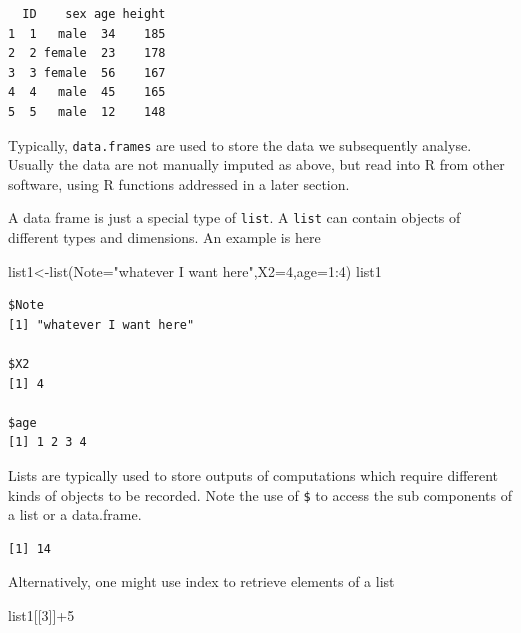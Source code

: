 \documentclass[
  letterpaper,
  DIV=11,
  numbers=noendperiod]{scrartcl}
\newenvironment{Shaded}{\begin{snugshade}}{\end{snugshade}}
\newcommand{\AttributeTok}[1]{\textcolor[rgb]{0.40,0.45,0.13}{#1}}
\newcommand{\DecValTok}[1]{\textcolor[rgb]{0.68,0.00,0.00}{#1}}
\newcommand{\FunctionTok}[1]{\textcolor[rgb]{0.28,0.35,0.67}{#1}}
\newcommand{\NormalTok}[1]{\textcolor[rgb]{0.00,0.23,0.31}{#1}}
\newcommand{\OtherTok}[1]{\textcolor[rgb]{0.00,0.23,0.31}{#1}}
\newcommand{\SpecialCharTok}[1]{\textcolor[rgb]{0.37,0.37,0.37}{#1}}
\newcommand{\StringTok}[1]{\textcolor[rgb]{0.13,0.47,0.30}{#1}}
\begin{document}
\begin{verbatim}
  ID    sex age height
1  1   male  34    185
2  2 female  23    178
3  3 female  56    167
4  4   male  45    165
5  5   male  12    148
\end{verbatim}

Typically, \texttt{data.frames} are used to store the data we
subsequently analyse. Usually the data are not manually imputed as
above, but read into R from other software, using R functions addressed
in a later section.

A data frame is just a special type of \texttt{list}. A \texttt{list}
can contain objects of different types and dimensions. An example is
here

\begin{Shaded}
\begin{Highlighting}[]
\NormalTok{list1}\OtherTok{\textless{}{-}}\FunctionTok{list}\NormalTok{(}\AttributeTok{Note=}\StringTok{"whatever I want here"}\NormalTok{,}\AttributeTok{X2=}\DecValTok{4}\NormalTok{,}\AttributeTok{age=}\DecValTok{1}\SpecialCharTok{:}\DecValTok{4}\NormalTok{)}
\NormalTok{list1}
\end{Highlighting}
\end{Shaded}

\begin{verbatim}
$Note
[1] "whatever I want here"

$X2
[1] 4

$age
[1] 1 2 3 4
\end{verbatim}

Lists are typically used to store outputs of computations which require
different kinds of objects to be recorded. Note the use of \texttt{\$}
to access the sub components of a list or a data.frame.

\begin{Shaded}
\end{Shaded}

\begin{verbatim}
[1] 14
\end{verbatim}

Alternatively, one might use index to retrieve elements of a list

\begin{Shaded}
\begin{Highlighting}[]
\NormalTok{list1[[}\DecValTok{3}\NormalTok{]]}\SpecialCharTok{+}\DecValTok{5}
\end{Highlighting}
\end{Shaded}
\end{document}
